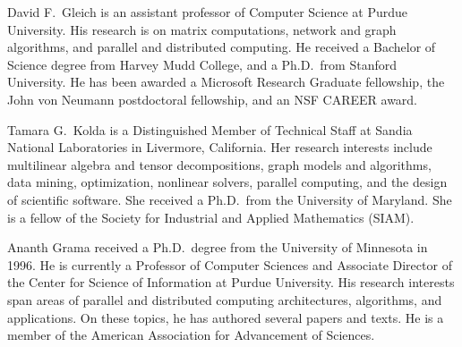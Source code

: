 \documentclass[10pt, journal, compsoc, final]{IEEEtran}
\begin{document}
\begin{IEEEbiography}{David F.~Gleich} 
is an assistant professor of
Computer Science at Purdue University. His
research is on matrix computations, network
and graph algorithms, and parallel and 
distributed computing. He received a Bachelor
of Science degree from Harvey Mudd College, 
and a Ph.D.~from Stanford University.
He has been awarded a Microsoft Research
Graduate fellowship, the John von Neumann
postdoctoral fellowship, and an NSF 
CAREER award.
\end{IEEEbiography}


\begin{IEEEbiography}{Tamara G.~Kolda}
is a Distinguished Member of Technical Staff at Sandia National Laboratories in Livermore, California. Her research interests include multilinear algebra and tensor decompositions, graph models and algorithms, data mining, optimization, nonlinear solvers, parallel computing, and the design of scientific software. She received a Ph.D.~from the University of Maryland. 
She is a fellow of the Society for Industrial and Applied Mathematics (SIAM).
\end{IEEEbiography}


\begin{IEEEbiography}{Ananth Grama} received
a Ph.D.~degree from the University of Minnesota in 1996. He is
currently a Professor of Computer Sciences and Associate Director of
the Center for Science of Information at Purdue University.
His research interests span areas of
parallel and distributed computing architectures,
algorithms, and applications. On these topics, he
has authored several papers and texts. He is a member of the
American Association for Advancement of Sciences.
\end{IEEEbiography}
\end{document}
